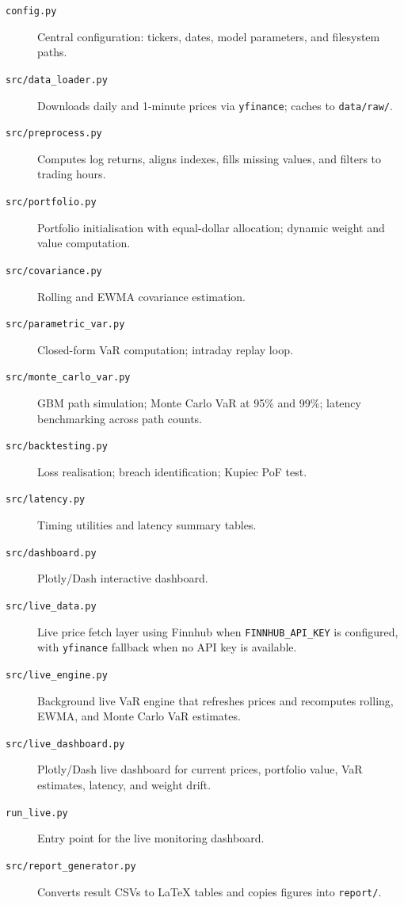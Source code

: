 \documentclass[12pt, a4paper]{article}
\begin{document}
\begin{description}
  \item[\texttt{config.py}] Central configuration: tickers, dates, model
        parameters, and filesystem paths.
  \item[\texttt{src/data\_loader.py}] Downloads daily and 1-minute prices
        via \texttt{yfinance}; caches to \texttt{data/raw/}.
  \item[\texttt{src/preprocess.py}] Computes log returns, aligns indexes,
        fills missing values, and filters to trading hours.
  \item[\texttt{src/portfolio.py}] Portfolio initialisation with equal-dollar
        allocation; dynamic weight and value computation.
  \item[\texttt{src/covariance.py}] Rolling and EWMA covariance estimation.
  \item[\texttt{src/parametric\_var.py}] Closed-form VaR computation;
        intraday replay loop.
  \item[\texttt{src/monte\_carlo\_var.py}] GBM path simulation; Monte Carlo
        VaR at 95\% and 99\%; latency benchmarking across path counts.
  \item[\texttt{src/backtesting.py}] Loss realisation; breach identification;
        Kupiec PoF test.
  \item[\texttt{src/latency.py}] Timing utilities and latency summary tables.
  \item[\texttt{src/dashboard.py}] Plotly/Dash interactive dashboard.
  \item[\texttt{src/live\_data.py}] Live price fetch layer using Finnhub when
        \texttt{FINNHUB\_API\_KEY} is configured, with \texttt{yfinance}
        fallback when no API key is available.
  \item[\texttt{src/live\_engine.py}] Background live VaR engine that refreshes
        prices and recomputes rolling, EWMA, and Monte Carlo VaR estimates.
  \item[\texttt{src/live\_dashboard.py}] Plotly/Dash live dashboard for current
        prices, portfolio value, VaR estimates, latency, and weight drift.
  \item[\texttt{run\_live.py}] Entry point for the live monitoring dashboard.
  \item[\texttt{src/report\_generator.py}] Converts result CSVs to LaTeX
        tables and copies figures into \texttt{report/}.
\end{description}

\end{document}
